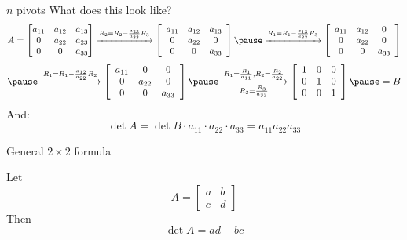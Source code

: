 \documentclass[xcoler=dvipsnames, aspectratio=169]{beamer}
\begin{document}
    \begin{frame}{$n$ pivots}
        What does this look like?\pause
        \[
            A = \begin{bmatrix}
                a_{11}  & a_{12}& a_{13}\\
                0       & a_{22}& a_{23}\\
                0       & 0     & a_{33}
            \end{bmatrix}\xrightarrow{R_2=R_2 - \frac{a_{23}}{a_{33}}R_3}\aMat{ccc}{
                a_{11}  & a_{12}& a_{13}\\
                0       & a_{22}& 0\\
                0       & 0     & a_{33}
            }\pause\xrightarrow{R_1 = R_1 - \frac{a_{13}}{a_{33}}R_3}\aMat{ccc}{
                a_{11}  & a_{12}& 0\\
                0       & a_{22}& 0\\
                0       & 0     & a_{33}
            }
        \]
        \[
            \pause\xrightarrow{R_1 = R_1 - \frac{a_{12}}{a_{22}}R_2}\aMat{ccc}{
                a_{11}  & 0     & 0\\
                0       & a_{22}& 0\\
                0       & 0     & a_{33}
            }\pause\xrightarrow[R_3=\frac{R_3}{a_{33}}]
            {R_1 = \frac{R_1}{a_{11}}, R_2 = \frac{R_2}{a_{22}}}
            \aMat{ccc}{
                1       & 0     & 0\\
                0       & 1     & 0\\
                0       & 0     & 1
            }\pause = B
        \]
        And:
        \pause
        \[
            \det{A} = \det{B}\cdot a_{11} \cdot a_{22} \cdot a_{33} = a_{11}a_{22}a_{33}
        \]
    \end{frame}
    \begin{frame}{General $2\times 2$ formula}
        \begin{theorem}
        Let 
        \[
            A = \begin{bmatrix}
                a & b\\
                c & d
            \end{bmatrix}
        \]
        Then
        \[
            \det{A} = ad-bc
        \]
        \end{theorem}
        \vspace{130pt}
    \end{frame}
    \iftoggle{showSolutions}{
        \begin{frame}{$a=0$ case}
            \begin{proof}
                If $a=0$, we need to have a pivot in $A_{11}$
                \pause
                \[
                    A = \aMat{cc}{
                        0 & b\\
                        c & d
                    }\pause\xrightarrow{R_1\leftrightarrow R_2}\aMat{cc}{
                        c & d\\
                        0 & b
                    } = B
                \]
                See that $\det{A} = -\det{B} = -bc\pause = ad - bc$.
            \end{proof}
        \end{frame}
    }{}
\end{document}
